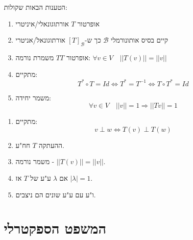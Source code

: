 \documentclass{tstextbook}
\begin{document}
\begin{proposition}
הטענות הבאות שקולות:

  \begin{enumerate}
    \item אופרטור \(T\) אורתוגונאלי/איניטרי 


    \item קיים בסיס אותונורמלי \(\mathcal{B}\) כך ש-\([T]_\mathcal{B}\) אורתוגונאל/אניטרי 


    \item אופרטור \(T\)\(T\) משמרת נורמה: \(\forall v\in V\quad ||T(v)||=||v||\)


    \item מתקיים: 
$$T^* \circ T = Id \iff T^* =T^{-1} \iff T\circ T^* = Id$$


    \item משמר יחידה: 
$$\forall v\in V\quad ||v||=1 \Rightarrow ||Tv||=1$$


  \end{enumerate}
\end{proposition}
\begin{proposition}
  \begin{enumerate}
    \item מתקיים: 
$$v\perp w \iff T(v)\perp T(w)$$


    \item ההעתקה \(T\) חח"ע. 


    \item משמר נורמה - \(||T(v)|| = ||v||\). 


    \item אם \(\lambda\) ע"ע של \(T\) אז \(|\lambda|=1\). 


    \item ו"ע עם ע"ע שונים הם ניצבים. 


  \end{enumerate}
\end{proposition}
\section{המשפט הספקטרלי}
\end{document}

